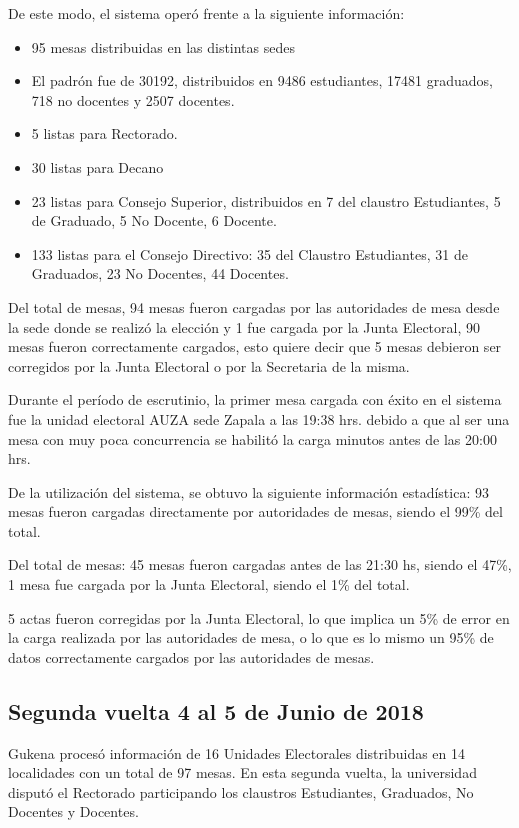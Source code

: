 De este modo, el sistema operó frente a la siguiente información:
\begin{itemize}
    \item 95 mesas distribuidas en las distintas sedes 
     \item El padrón fue de  30192, distribuidos en 9486 estudiantes, 17481 graduados, 718 no docentes y 2507 docentes.
     \item 5 listas para Rectorado.
     \item 30 listas para Decano
    \item 23 listas para Consejo Superior, distribuidos en 7 del claustro Estudiantes, 5 de Graduado, 5 No Docente, 6 Docente.
    \item 133 listas para el Consejo Directivo: 35 del Claustro Estudiantes, 31 de Graduados, 23 No Docentes, 44 Docentes.
\end{itemize}
Del total de mesas, 94 mesas fueron cargadas por las autoridades de mesa desde la sede donde se realizó la elección y 1 fue cargada por la Junta Electoral, 90 mesas fueron correctamente cargados, esto quiere decir que 5 mesas debieron ser corregidos por la Junta Electoral o por la Secretaria de la misma.

Durante el período de escrutinio, la primer mesa cargada con éxito en el sistema fue la unidad electoral AUZA sede Zapala a las 19:38 hrs. debido a que al ser una mesa con muy poca concurrencia se habilitó la carga minutos antes de las 20:00 hrs.

De la utilización del sistema, se obtuvo la siguiente información estadística:
93 mesas fueron cargadas directamente por autoridades de mesas, siendo el 99\% del total.

Del total de mesas:
45 mesas fueron cargadas antes de las 21:30 hs, siendo el 47\%,
1 mesa fue cargada 	por la Junta Electoral, siendo el 1\% del total.

5 actas fueron corregidas por la Junta Electoral, lo que implica un 5\% de error en la carga realizada por las autoridades de mesa, o lo que es lo mismo un 95\% de datos correctamente cargados por las autoridades de mesas.

\subsection{Segunda vuelta 4 al 5 de Junio de 2018}
Gukena procesó información de 16 Unidades Electorales distribuidas en 14 localidades con un total de 97 mesas. En esta segunda vuelta, la universidad disputó el Rectorado participando los claustros Estudiantes, Graduados, No Docentes y Docentes.

